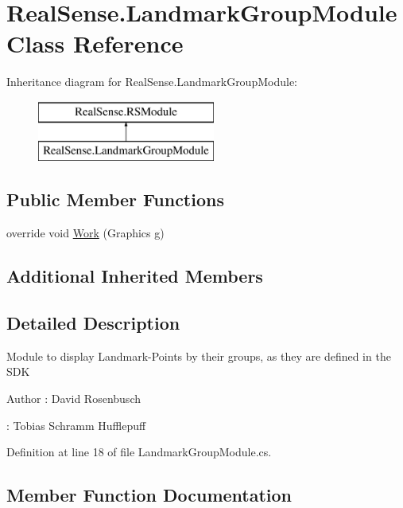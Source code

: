 \hypertarget{class_real_sense_1_1_landmark_group_module}{}\section{Real\+Sense.\+Landmark\+Group\+Module Class Reference}
\label{class_real_sense_1_1_landmark_group_module}
Inheritance diagram for Real\+Sense.\+Landmark\+Group\+Module\+:\begin{figure}[H]
\begin{center}
\leavevmode
\includegraphics[height=2.000000cm]{class_real_sense_1_1_landmark_group_module}
\end{center}
\end{figure}
\subsection*{Public Member Functions}
\begin{DoxyCompactItemize}
\item 
override void \hyperlink{class_real_sense_1_1_landmark_group_module_aae68525cdcf843719e02fa9b7317d3fa}{Work} (Graphics g)
\end{DoxyCompactItemize}
\subsection*{Additional Inherited Members}


\subsection{Detailed Description}
Module to display Landmark-\/\+Points by their groups, as they are defined in the S\+DK \begin{DoxyAuthor}{Author}
\+: David Rosenbusch 

\+: Tobias Schramm  Hufflepuff 
\end{DoxyAuthor}


Definition at line 18 of file Landmark\+Group\+Module.\+cs.



\subsection{Member Function Documentation}
\mbox{\label{class_real_sense_1_1_landmark_group_module_aae68525cdcf843719e02fa9b7317d3fa}} 
